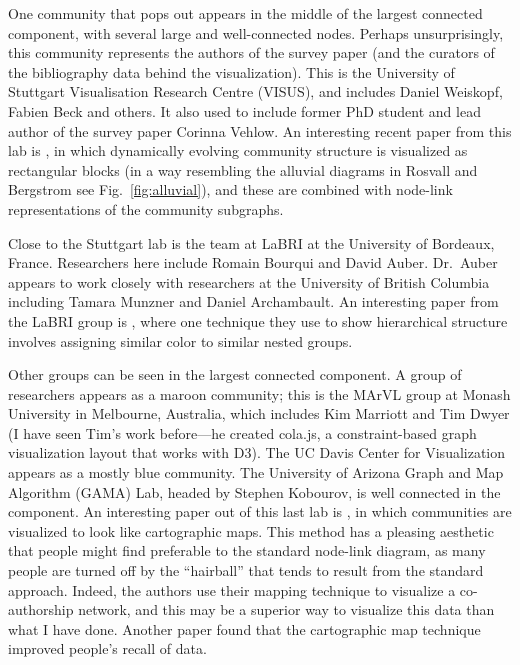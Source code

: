 One community that pops out appears in the middle of the largest
connected component, with several large and well-connected nodes.
Perhaps unsurprisingly, this community represents the authors of the
survey paper (and the curators of the bibliography data behind the
visualization). This is the University of Stuttgart Visualisation
Research Centre (VISUS), and includes Daniel Weiskopf, Fabien Beck and
others. It also used to include former PhD student and lead author of
the survey paper Corinna Vehlow. An interesting recent paper from this
lab is \autocite{vehlow_visualizing_2015}, in which dynamically evolving
community structure is visualized as rectangular blocks (in a way
resembling the alluvial diagrams in Rosvall and Bergstrom
\autocite{rosvall_mapping_2010} see Fig.~\ref{fig:alluvial}), and these
are combined with node-link representations of the community subgraphs.

Close to the Stuttgart lab is the team at LaBRI at the University of
Bordeaux, France. Researchers here include Romain Bourqui and David
Auber. Dr.~Auber appears to work closely with researchers at the
University of British Columbia including Tamara Munzner and Daniel
Archambault. An interesting paper from the LaBRI group is
\autocite{sansen_adjasankey:_2015}, where one technique they use to show
hierarchical structure involves assigning similar color to similar
nested groups.

Other groups can be seen in the largest connected component. A group of
researchers appears as a maroon community; this is the MArVL group at
Monash University in Melbourne, Australia, which includes Kim Marriott
and Tim Dwyer (I have seen Tim's work before---he created cola.js, a
constraint-based graph visualization layout that works with D3). The UC
Davis Center for Visualization appears as a mostly blue community. The
University of Arizona Graph and Map Algorithm (GAMA) Lab, headed by
Stephen Kobourov, is well connected in the component. An interesting
paper out of this last lab is \autocite{gansner_gmap:_2010}, in which
communities are visualized to look like cartographic maps. This method
has a pleasing aesthetic that people might find preferable to the
standard node-link diagram, as many people are turned off by the
``hairball'' that tends to result from the standard approach. Indeed,
the authors use their mapping technique to visualize a co-authorship
network, and this may be a superior way to visualize this data than what
I have done. Another paper \autocite{saket_map-based_2015} found that
the cartographic map technique improved people's recall of data.


